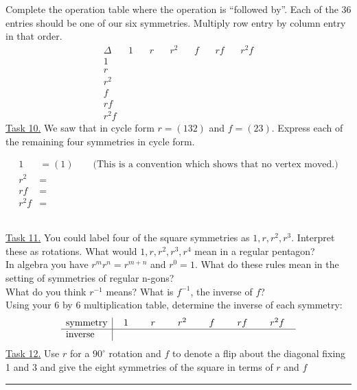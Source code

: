 \documentclass[12pt]{article}
\theoremstyle{definition}
\begin{document}
Complete the operation table where the operation is ``followed by''.  Each of the 36 entries should be one of our six symmetries.  Multiply row entry by column entry in that order.
$$\begin{array}{r|rrrrrr}
\Delta & ~~1~~ & ~~r~~ & ~~r^2~~ & ~~f~~ & ~~rf~~ & ~~r^2f \\
\hline
1 &\\
r & \\
r^2 &\\
f & \\
rf & \\
r^2f &
\end{array}$$
\newpage
\underline{Task 10.}  We saw that in cycle form $r=(132)$ and $f=(23)$.  Express each of the remaining four symmetries in cycle form.\\
\begin{minipage}{6in}\begin{equation*}\begin{split}
1 &= (1) \qquad \text{(This is a convention which shows that no vertex moved.)}\\
r^2 &=\\
rf &=\\
r^2f &=
\end{split}\end{equation*}\end{minipage}\\[.1in]
\underline{Task 11.}  You could label four of the square symmetries as $1, r, r^2, r^3$.  Interpret these as rotations.  What would $1, r, r^2, r^3,r^4$ mean in a regular pentagon?\\[.2in]
In algebra you have $r^mr^n=r^{m+n}$ and $r^0 = 1$.  What do these rules mean in the setting of symmetries of regular n-gons?\\[.2in]
What do you think $r^{-1}$ means?  What is $f^{-1}$, the inverse of $f$?\\[.2in]
Using your 6 by 6 multiplication table, determine the inverse of each symmetry:\\
$$\begin{array}{l | cccccc}
\text{symmetry} & ~~1~~&~~r~~&~~r^2~~&~~f~~&~~rf~~&~~r^2f~~\\
\hline
\text{inverse}&
\end{array}$$
\underline{Task 12.}  Use $r$ for a $90^\circ$ rotation and $f$ to denote a flip about the diagonal fixing 1 and 3 and give the eight symmetries of the square in terms of $r$ and $f$\\
\rule{6in}{0in}\vfill
\newpage
\end{document}
